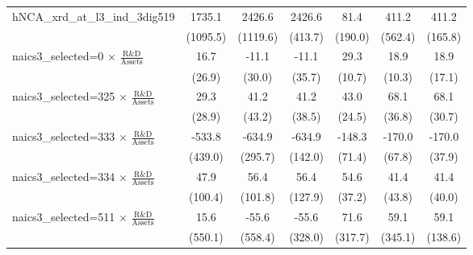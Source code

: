 {\begin{tabular}{l*{6}{c}}
\addlinespace
hNCA\_xrd\_at\_l3\_ind\_3dig519&      1735.1         &      2426.6\sym{**} &      2426.6\sym{***}&        81.4         &       411.2         &       411.2\sym{**} \\
                    &    (1095.5)         &    (1119.6)         &     (413.7)         &     (190.0)         &     (562.4)         &     (165.8)         \\
\addlinespace
naics3\_selected=0 $\times$ $\frac{\textrm{R\&D}}{\textrm{Assets}}$&        16.7         &       -11.1         &       -11.1         &        29.3\sym{***}&        18.9\sym{*}  &        18.9         \\
                    &      (26.9)         &      (30.0)         &      (35.7)         &      (10.7)         &      (10.3)         &      (17.1)         \\
\addlinespace
naics3\_selected=325 $\times$ $\frac{\textrm{R\&D}}{\textrm{Assets}}$&        29.3         &        41.2         &        41.2         &        43.0\sym{*}  &        68.1\sym{*}  &        68.1\sym{**} \\
                    &      (28.9)         &      (43.2)         &      (38.5)         &      (24.5)         &      (36.8)         &      (30.7)         \\
\addlinespace
naics3\_selected=333 $\times$ $\frac{\textrm{R\&D}}{\textrm{Assets}}$&      -533.8         &      -634.9\sym{**} &      -634.9\sym{***}&      -148.3\sym{**} &      -170.0\sym{**} &      -170.0\sym{***}\\
                    &     (439.0)         &     (295.7)         &     (142.0)         &      (71.4)         &      (67.8)         &      (37.9)         \\
\addlinespace
naics3\_selected=334 $\times$ $\frac{\textrm{R\&D}}{\textrm{Assets}}$&        47.9         &        56.4         &        56.4         &        54.6         &        41.4         &        41.4         \\
                    &     (100.4)         &     (101.8)         &     (127.9)         &      (37.2)         &      (43.8)         &      (40.0)         \\
\addlinespace
naics3\_selected=511 $\times$ $\frac{\textrm{R\&D}}{\textrm{Assets}}$&        15.6         &       -55.6         &       -55.6         &        71.6         &        59.1         &        59.1         \\
                    &     (550.1)         &     (558.4)         &     (328.0)         &     (317.7)         &     (345.1)         &     (138.6)         \\

\end{tabular}}
